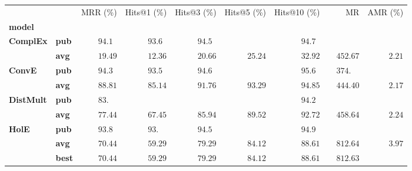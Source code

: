 \begin{tabular}{llrrrrrrr}
\toprule
       &     &           MRR (\%) &        Hits@1 (\%) &        Hits@3 (\%) &        Hits@5 (\%) &       Hits@10 (\%) &                              MR &            AMR (\%) \\
\textbf{model} & {} &                    &                    &                    &                    &                    &                                 &                     \\
\midrule
\textbf{ComplEx} & \textbf{pub} &  $94.1\phantom{0}$ &  $93.6\phantom{0}$ &  $94.5\phantom{0}$ &                    &  $94.7\phantom{0}$ &                                 &                     \\
       & \textbf{avg} &            $19.49$ &            $12.36$ &            $20.66$ &            $25.24$ &            $32.92$ &            $\phantom{00}452.67$ &  $\phantom{00}2.21$ \\\midrule
\textbf{ConvE} & \textbf{pub} &  $94.3\phantom{0}$ &  $93.5\phantom{0}$ &  $94.6\phantom{0}$ &                    &  $95.6\phantom{0}$ &  $\phantom{00}374.\phantom{00}$ &                     \\
       & \textbf{avg} &            $88.81$ &            $85.14$ &            $91.76$ &            $93.29$ &            $94.85$ &            $\phantom{00}444.40$ &  $\phantom{00}2.17$ \\\midrule
\textbf{DistMult} & \textbf{pub} &  $83.\phantom{00}$ &                    &                    &                    &  $94.2\phantom{0}$ &                                 &                     \\
       & \textbf{avg} &            $77.44$ &            $67.45$ &            $85.94$ &            $89.52$ &            $92.72$ &            $\phantom{00}458.64$ &  $\phantom{00}2.24$ \\\midrule
\textbf{HolE} & \textbf{pub} &  $93.8\phantom{0}$ &  $93.\phantom{00}$ &  $94.5\phantom{0}$ &                    &  $94.9\phantom{0}$ &                                 &                     \\
       & \textbf{avg} &            $70.44$ &            $59.29$ &            $79.29$ &            $84.12$ &            $88.61$ &            $\phantom{00}812.64$ &  $\phantom{00}3.97$ \\
       & \textbf{best} &            $70.44$ &            $59.29$ &            $79.29$ &            $84.12$ &            $88.61$ &            $\phantom{00}812.63$ &                     \\

\end{tabular}
